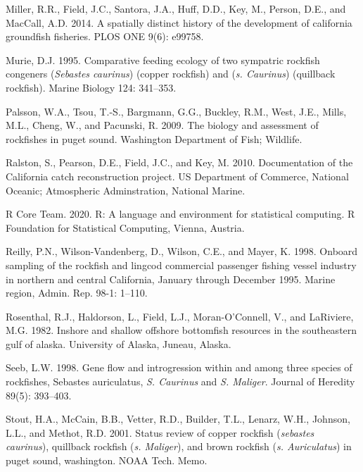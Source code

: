 \documentclass[11pt,
  english,
  letterpaper,
]{article}
\begin{document}
\leavevmode\hypertarget{ref-Milleretal_2014}{}%
Miller, R.R., Field, J.C., Santora, J.A., Huff, D.D., Key, M., Person, D.E., and MacCall, A.D. 2014. A spatially distinct history of the development of california groundfish fisheries. PLOS ONE 9(6): e99758.

\leavevmode\hypertarget{ref-Murie_diet_1995}{}%
Murie, D.J. 1995. Comparative feeding ecology of two sympatric rockfish congeners (\emph{Sebastes caurinus}) (copper rockfish) and (\emph{s. Caurinus}) (quillback rockfish). Marine Biology 124: 341--353.

\leavevmode\hypertarget{ref-Palssonetal_2009}{}%
Palsson, W.A., Tsou, T.-S., Bargmann, G.G., Buckley, R.M., West, J.E., Mills, M.L., Cheng, W., and Pacunski, R. 2009. The biology and assessment of rockfishes in puget sound. Washington Department of Fish; Wildlife.

\leavevmode\hypertarget{ref-ralston_documentation_2010}{}%
Ralston, S., Pearson, D.E., Field, J.C., and Key, M. 2010. Documentation of the California catch reconstruction project. US Department of Commerce, National Oceanic; Atmospheric Adminstration, National Marine.

\leavevmode\hypertarget{ref-R_2020}{}%
R Core Team. 2020. R: A language and environment for statistical computing. R Foundation for Statistical Computing, Vienna, Austria.

\leavevmode\hypertarget{ref-Reilly1998}{}%
Reilly, P.N., Wilson-Vandenberg, D., Wilson, C.E., and Mayer, K. 1998. Onboard sampling of the rockfish and lingcod commercial passenger fishing vessel industry in northern and central California, January through December 1995. Marine region, Admin. Rep. 98-1: 1--110.

\leavevmode\hypertarget{ref-Rosenthaletal_maturity_1982}{}%
Rosenthal, R.J., Haldorson, L., Field, L.J., Moran-O'Connell, V., and LaRiviere, M.G. 1982. Inshore and shallow offshore bottomfish resources in the southeastern gulf of alaska. University of Alaska, Juneau, Alaska.

\leavevmode\hypertarget{ref-seeb_gene_1998}{}%
Seeb, L.W. 1998. Gene flow and introgression within and among three species of rockfishes, Sebastes auriculatus, \emph{S. Caurinus} and \emph{S. Maliger}. Journal of Heredity 89(5): 393--403.

\leavevmode\hypertarget{ref-Stoutetal_DPS_2001}{}%
Stout, H.A., McCain, B.B., Vetter, R.D., Builder, T.L., Lenarz, W.H., Johnson, L.L., and Methot, R.D. 2001. Status review of copper rockfish (\emph{sebastes caurinus}), quillback rockfish (\emph{s. Maliger}), and brown rockfish (\emph{s. Auriculatus}) in puget sound, washington. NOAA Tech. Memo.
\end{document}
